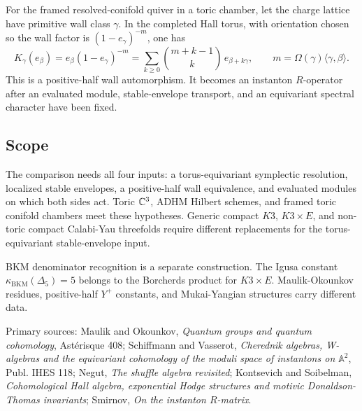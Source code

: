 For the framed resolved-conifold quiver in a toric chamber, let the
charge lattice have primitive wall class \(\gamma\). In the completed
Hall torus, with orientation chosen so the wall factor is
\((1-e_{\gamma})^{-m}\), one has
\[
  K_{\gamma}(e_{\beta})
  =
  e_{\beta}(1-e_{\gamma})^{-m}
  =
  \sum_{k\geq0}
  \binom{m+k-1}{k}\,
  e_{\beta+k\gamma},
  \qquad
  m=\Omega(\gamma)\langle\gamma,\beta\rangle .
\]
This is a positive-half wall automorphism. It becomes an instanton
\(R\)-operator after an evaluated module, stable-envelope transport,
and an equivariant spectral character have been fixed.

\subsection*{Scope}

The comparison needs all four inputs: a torus-equivariant symplectic
resolution, localized stable envelopes, a positive-half wall
equivalence, and evaluated modules on which both sides act. Toric
\(\mathbb C^3\), ADHM Hilbert schemes, and framed toric conifold chambers meet
these hypotheses. Generic compact \(K3\), \(K3\times E\), and non-toric
compact Calabi-Yau threefolds require different replacements for the
torus-equivariant stable-envelope input.

BKM denominator recognition is a separate construction. The Igusa
constant \(\kappa_{\mathrm{BKM}}(\Delta_5)=5\) belongs to the Borcherds
product for \(K3\times E\). Maulik-Okounkov residues, positive-half
\(Y^+\) constants, and Mukai-Yangian structures carry different data.

Primary sources: Maulik and Okounkov, \emph{Quantum groups and quantum
cohomology}, Ast\'erisque 408; Schiffmann and Vasserot, \emph{Cherednik
algebras, W-algebras and the equivariant cohomology of the moduli space
of instantons on \(\mathbb A^2\)}, Publ. IHES 118; Negut, \emph{The
shuffle algebra revisited}; Kontsevich and Soibelman, \emph{Cohomological
Hall algebra, exponential Hodge structures and motivic Donaldson-Thomas
invariants}; Smirnov, \emph{On the instanton \(R\)-matrix}.
